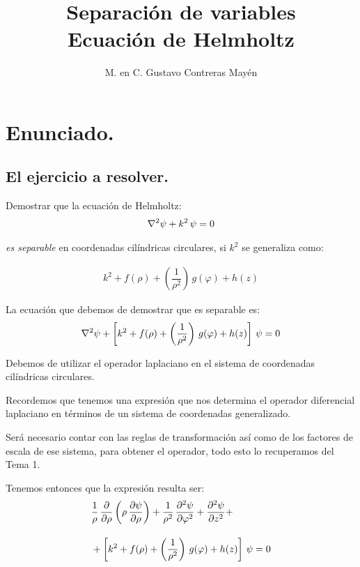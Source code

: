 
\title{Separación de variables \\ Ecuación de Helmholtz} \vspace{-3ex}
\author{M. en C. Gustavo Contreras Mayén}
\date{ }
\newcommand{\Cancel}[2][black]{{\color{#1}\cancel{\color{black}#2}}}

\vspace{-4cm}
\maketitle
\fontsize{14}{14}\selectfont
\tableofcontents
\newpage

\section{Enunciado.}

\subsection{El ejercicio a resolver.}

Demostrar que la ecuación de Helmholtz:
\begin{align*}
\laplacian{\psi} + k^{2} \, \psi = 0
\end{align*}

\emph{es separable} en coordenadas cilíndricas circulares,  si $k^{2}$ se generaliza como:

\begin{align*}
k^{2} + f(\rho) + \left( \dfrac{1}{\rho^{2}} \right) \, g(\varphi) + h(z)
\end{align*}

La ecuación que debemos de demostrar que es separable es:
\begin{align*}
\laplacian{\psi} + \left[ k^{2} + f(\rho) + \left( \dfrac{1}{\rho^{2}} \right) \, g(\varphi) + h(z) \right] \, \psi = 0
\end{align*}

Debemos de utilizar el operador laplaciano en el sistema de coordenadas cilíndricas circulares.
\par
Recordemos que tenemos una expresión que nos determina el operador diferencial laplaciano en términos de un sistema de coordenadas generalizado.
\par
Será necesario contar con las reglas de transformación así como de los factores de escala de ese sistema, para obtener el operador, todo esto lo recuperamos del Tema 1.
\par
Tenemos entonces que la expresión resulta ser:
\begin{align*}
&{} \dfrac{1}{\rho} \, \pdv{\rho} \left( \rho \, \pdv{\psi}{\rho} \right) + \dfrac{1}{\rho^{2}} \, \pdv[2]{\psi}{\varphi} + \pdv[2]{\psi}{z} + \\[1em]
&+ \left[ k^{2} + f(\rho) + \left( \dfrac{1}{\rho^{2}} \right) \, g(\varphi) + h(z) \right] \, \psi = 0
\end{align*}

